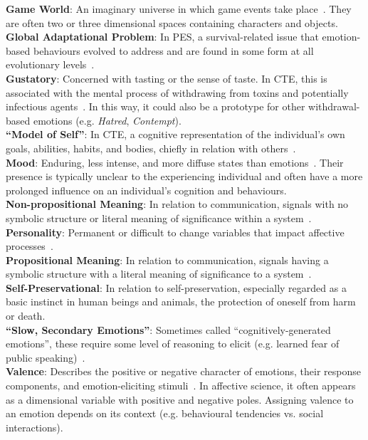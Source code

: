 \noindent\textbf{Game World}: An imaginary universe in which game events  take
place~\citep{adams2014fundamentals}. They are often two or three dimensional
spaces containing characters and objects. \\

\noindent\textbf{Global Adaptational Problem}: In PES, a survival-related issue
that emotion-based behaviours evolved to address and are found in some form at
all evolutionary levels~\citep{robert1980emotion}. \\

\noindent\textbf{Gustatory}: Concerned with tasting or the sense of taste. In
CTE, this is associated with the mental process of withdrawing from toxins and
potentially infectious agents~\citep[p.~57]{oatley1992best}. In this way, it
could also be a prototype for other withdrawal-based emotions (e.g.
\textit{Hatred}, \textit{Contempt}). \\

\noindent\textbf{``Model of Self''}: In CTE, a cognitive representation of the
individual's own goals, abilities, habits, and bodies, chiefly in relation with
others~\citep[p.~195]{oatley1992best}. \\

\noindent\textbf{Mood}: Enduring, less intense, and more diffuse states than
emotions~\citep{oxfordMood}. Their presence is typically unclear to the
experiencing individual and often have a more prolonged influence on an
individual’s cognition and behaviours. \\

\noindent\textbf{Non-propositional Meaning}: In relation to communication,
signals with no symbolic structure or literal meaning of significance within a
system~\citep[p.~32]{oatley1987towards}. \\

\noindent\textbf{Personality}: Permanent or difficult to change variables that
impact affective processes~\citep{oxfordPersonality}. \\

\noindent\textbf{Propositional Meaning}: In relation to communication, signals
having a symbolic structure with a literal meaning of significance to a
system~\citep[p.~32]{oatley1987towards}. \\

\noindent\textbf{Self-Preservational}: In relation to self-preservation,
especially regarded as a basic instinct in human beings and animals, the
protection of oneself from harm or death. \\

\noindent\textbf{``Slow, Secondary Emotions''}: Sometimes called 
``cognitively-generated emotions'', these require some level of reasoning to 
elicit (e.g. learned fear of public 
speaking)~\citep[p.~60--70]{picard1997affective}. \\

\noindent\textbf{Valence}: Describes the positive or negative character of
emotions, their response components, and emotion-eliciting
stimuli~\cite{oxfordValence}. In affective science, it often appears as a
dimensional variable with positive and negative poles. Assigning valence to
an emotion depends on its context (e.g. behavioural tendencies vs. social
interactions).